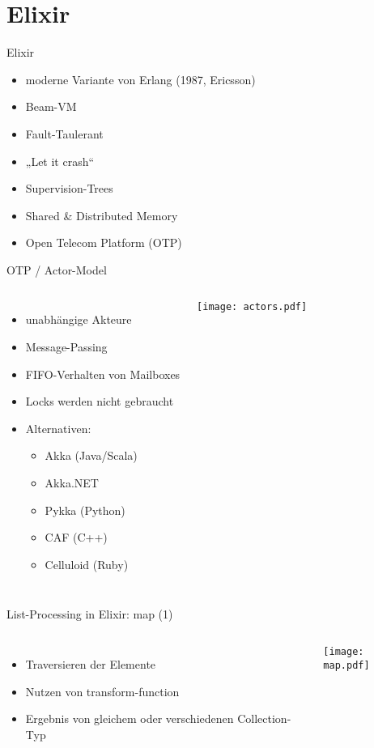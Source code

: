 \documentclass[compress]{beamer}
\begin{document}
\section{Elixir}
  \begin{frame}{Elixir}
    \begin{itemize}
      \item moderne Variante von Erlang (1987, Ericsson)
      \item Beam-VM
      \item Fault-Taulerant
      \item „Let it crash“
      \item Supervision-Trees
      \item Shared \& Distributed Memory
      \item Open Telecom Platform (OTP)
    \end{itemize}
  \end{frame}

  \begin{frame}{OTP / Actor-Model}
    \begin{columns}[c]
    \begin{itemize}
      \item unabhängige Akteure
      \item Message-Passing
      \item FIFO-Verhalten von \alert{Mailboxes}
      \item Locks werden nicht gebraucht
      \item Alternativen:
        \begin{itemize}
          \item Akka (Java/Scala)
          \item Akka.NET
          \item Pykka (Python)
          \item CAF (C++)
          \item Celluloid (Ruby)
        \end{itemize}
    \end{itemize}
      \texttt{[image: actors.pdf]}
    \end{columns}
  \end{frame}
  
  \begin{frame}{List-Processing in Elixir: map (1)}
    \begin{columns}[c]
      \begin{itemize}
        \item Traversieren der Elemente
        \item Nutzen von transform-function
        \item Ergebnis von gleichem oder verschiedenen Collection-Typ
      \end{itemize}
    \texttt{[image: map.pdf]}
    \end{columns}
  \end{frame}
\end{document}
